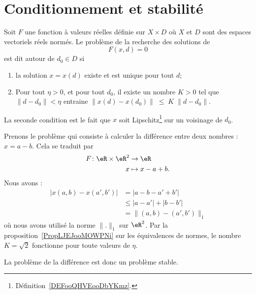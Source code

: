 \section{Conditionnement et stabilité}

\begin{definition}      \label{DEFooYIFAooSJbMkC}
	Soit \( F\) une fonction à valeurs réelles définie sur \( X\times D\) où \( X\) et \( D\) sont des espaces vectoriels réels normés. Le problème de la recherche des solutions de
	\begin{equation}
		F(x,d)=0
	\end{equation}
	est dit  autour de \( d_0\in D\) si
	\begin{enumerate}
		\item
		      la solution \( x=x(d)\) existe et est unique pour tout \( d\);
		\item \label{ItemProbStableB}
		      Pour tout \( \eta>0\), et pour tout \( d_0\), il existe un nombre \( K>0\) tel que \( \| d-d_0\|<\eta\) entraine \( \|x(d)-x(d_0)\|\;\leq\;K\;\|d-d_0\|\).
	\end{enumerate}
	La seconde condition est le fait que \( x\) soit Lipschitz\footnote{Définition~\ref{DEFooQHVEooDbYKmz}.} sur un voisinage de \( d_0\).
\end{definition}

\begin{example}    \label{ExooXJONooTAYZVc}
	Prenons le problème qui consiste à calculer la différence entre deux nombres : \( x=a-b\). Cela se traduit par
	\begin{equation}
		\begin{aligned}
			F\colon \eR\times \eR^2 & \to \eR        \\
			x                       & \mapsto x-a+b.
		\end{aligned}
	\end{equation}
	Nous avons :
	\begin{subequations}
		\begin{align}
			\big| x(a,b)-x(a',b') \big| & =| a-b-a'+b' |           \\
			                            & \leq| a-a' |+| b-b' |    \\
			                            & =\|  (a,b)-(a',b')  \|_1
		\end{align}
	\end{subequations}
	où nous avons utilisé la norme \( \| . \|_1\) sur \( \eR^2\). Par la proposition~\ref{PropLJEJooMOWPNi} sur les équivalences de normes, le nombre \( K=\sqrt{2}\) fonctionne pour toute valeurs de \( \eta\).

	La problème de la différence est donc un problème stable.
\end{example}

